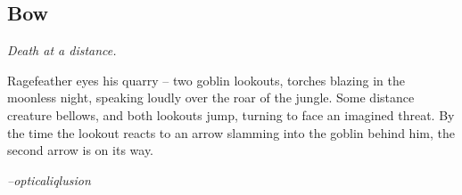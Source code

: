 \subsection{Bow}
\textit{Death at a distance.}

\begin{quotebox}
Ragefeather eyes his quarry -- two goblin lookouts, torches blazing in the moonless night, speaking loudly over the roar of the jungle. Some distance creature bellows, and both lookouts jump, turning to face an imagined threat. By the time the lookout reacts to an arrow slamming into the goblin behind him, the second arrow is on its way.

\textit{--opticaliqlusion}
\end{quotebox}
